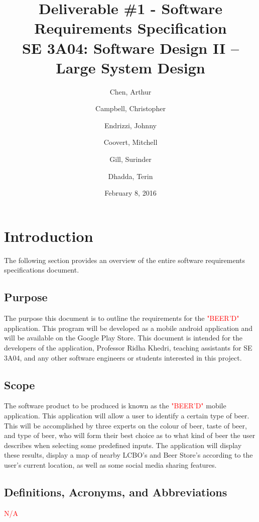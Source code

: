 \documentclass[]{article}
\title{Deliverable \#1 - Software Requirements Specification \\
	SE 3A04: Software Design II -- Large System Design}
\author{Chen, Arthur \and Campbell, Christopher \and Endrizzi, Johnny \\ 
\and Coovert, Mitchell \and Gill, Surinder \and Dhadda, Terin}
\date{February 8, 2016}
\begin{document}
\maketitle	
\newpage
\tableofcontents
\listoftables
\newpage

\section{Introduction}
\label{sec:introduction}

The following section provides an overview of the entire software requirements specifications document.

\subsection{Purpose}
\label{sub:purpose}
The purpose this document is to outline the requirements for the \textcolor{red}{"BEER'D"} application. This program will be developed as a mobile android application and will be available on the Google Play Store. This document is intended for the developers of the application, Professor Ridha Khedri, teaching assistants for SE 3A04, and any other software engineers or students interested in this project.

\subsection{Scope}
\label{sub:scope}
The software product to be produced is known as the \textcolor{red}{"BEER'D"} mobile application. This application will allow a user to identify a certain type of beer. This will be accomplished by three experts on the colour of beer, taste of beer, and type of beer, who will form their best choice as to what kind of beer the user describes when selecting some predefined inputs. The application will display these results, display a map of nearby LCBO's and Beer Store's according to the user's current location, as well as some social media sharing features.

\subsection{Definitions, Acronyms, and Abbreviations}
\label{sub:definitions_acronyms_and_abbreviations}
	\textcolor{red}{N/A}
\end{document}
